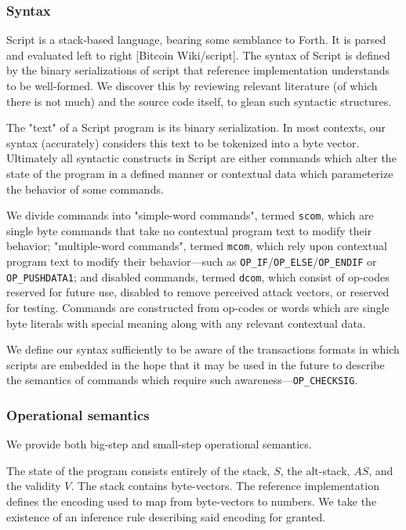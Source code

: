 \documentclass[letterpaper, 10 pt, conference]{ieeeconf}
\begin{document}
\subsubsection{Syntax}

Script is a stack-based language, bearing some semblance to Forth. It is parsed and evaluated left to right [Bitcoin Wiki/script]. The syntax of Script is defined by the binary serializations of script that reference implementation understands to be well-formed. We discover this by reviewing relevant literature (of which there is not much) and the source code itself, to glean such syntactic structures.

The "text" of a Script program is its binary serialization. In most contexts, our syntax (accurately) considers this text to be tokenized into a byte vector. Ultimately all syntactic constructs in Script are either commands which alter the state of the program in a defined manner or contextual data which parameterize the behavior of some commands.

We divide commands into "simple-word commands", termed \texttt{scom}, which are single byte commands that take no contextual program text to modify their behavior; "multiple-word commands", termed \texttt{mcom}, which rely upon contextual program text to modify their behavior---such as \texttt{OP\_IF}/\texttt{OP\_ELSE}/\texttt{OP\_ENDIF} or \texttt{OP\_PUSHDATA1}; and disabled commands, termed \texttt{dcom}, which consist of op-codes reserved for future use, disabled to remove perceived attack vectors, or reserved for testing. Commands are constructed from op-codes or words which are single byte literals with special meaning along with any relevant contextual data.

We define our syntax sufficiently to be aware of the transactions formats in which scripts are embedded in the hope that it may be used in the future to describe the semantics of commands which require such awareness---\texttt{OP\_CHECKSIG}.

\subsubsection{Operational semantics}

We provide both big-step and small-step operational semantics.

The state of the program consists entirely of the stack, $S$, the alt-stack, $AS$, and the validity $V$. The stack contains byte-vectors. The reference implementation defines the encoding used to map from byte-vectors to numbers. We take the existence of an inference rule describing said encoding for granted.
\end{document}
